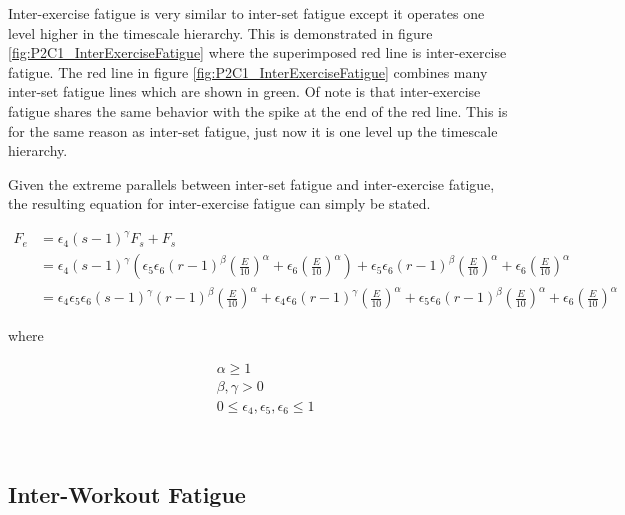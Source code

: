 Inter-exercise fatigue is very similar to inter-set fatigue except  it operates one level higher in the timescale hierarchy. This is demonstrated in figure \ref{fig:P2C1_InterExerciseFatigue} where the superimposed red line is inter-exercise fatigue. The red line in figure \ref{fig:P2C1_InterExerciseFatigue} combines many inter-set fatigue lines which are shown in green. Of note is that inter-exercise fatigue shares the same behavior with the spike at the end of the red line. This is for the same reason as inter-set fatigue, just now it is one level up the timescale hierarchy.

Given the extreme parallels between inter-set fatigue and inter-exercise fatigue, the resulting equation for inter-exercise fatigue can simply be stated.

\begin{minipage}{\textwidth}
	\begin{equation}
		\label{eq:P2C1_InterExerciseFatigue}
		\begin{split}
			F_e & = \epsilon_4 (s-1) ^ \gamma F_s + F_s \\
			& = \epsilon_4 (s-1)^\gamma \left(
				\epsilon_5 \epsilon_6 (r-1)^\beta \left(
					\frac{E}{10} 
				\right)^\alpha
				+ \epsilon_6 \left( \frac{E}{10} \right)^\alpha
			\right)+
			\epsilon_5 \epsilon_6 (r-1)^\beta \left(
				\frac{E}{10} 
			\right)^\alpha
			+ \epsilon_6 \left( \frac{E}{10} \right)^\alpha \\
			& = 
			\epsilon_4 \epsilon_5 \epsilon_6
			(s-1)^\gamma 
			(r-1)^\beta
			\left(
				\frac{E}{10} 
			\right)^\alpha
			+
			\epsilon_4 \epsilon_6 (r-1)^\gamma
			\left(
				\frac{E}{10} 
			\right)^\alpha
			+
			\epsilon_5 \epsilon_6 (r-1)^\beta
			\left(
				\frac{E}{10} 
			\right)^\alpha
			+
			\epsilon_6
			\left(
				\frac{E}{10} 
			\right)^\alpha
		\end{split}
	\end{equation}
	\centerline{where}
	\begin{equation*}
		\begin{split}
		    & \alpha \ge 1 \\
		    & \beta,\gamma > 0 \\
			& 0 \le \epsilon_4, \epsilon_5, \epsilon_6 \le 1
		\end{split}
	\end{equation*}
\end{minipage}\\


\subsection{Inter-Workout Fatigue}
\label{sec:P2C1_InterWorkoutFatigue}

